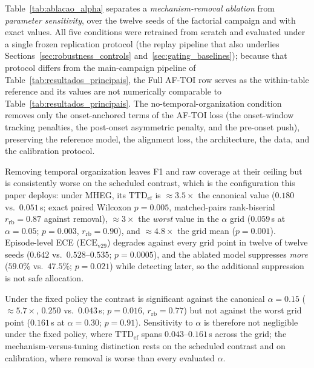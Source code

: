 \documentclass[a4paper,fleqn]{cas-dc}
\newcommand{\MHEG}{\mbox{MHEG}\xspace}
\begin{document}
{\color{\revcolor}Table~\ref{tab:ablacao_alpha} separates a
\emph{mechanism-removal ablation} from \emph{parameter sensitivity}, over the
twelve seeds of the factorial campaign and with exact values. All five
conditions were retrained from scratch and evaluated under a single frozen
replication protocol (the replay pipeline that also underlies
Sections~\ref{sec:robustness_controls} and~\ref{sec:gating_baselines}); because that
protocol differs from the main-campaign pipeline of
Table~\ref{tab:resultados_principais}, the Full \mbox{AF-TOI} row serves as
the within-table reference and its values are not numerically comparable to
Table~\ref{tab:resultados_principais}. The
no-temporal-organization condition removes only the onset-anchored terms of
the \mbox{AF-TOI} loss (the onset-window tracking penalties, the post-onset
asymmetric penalty, and the pre-onset push), preserving the reference model,
the alignment loss, the architecture, the data, and the calibration protocol.

Removing temporal organization leaves F1 and raw coverage at their ceiling
but is consistently worse on the scheduled contrast, which is the
configuration this paper deploys: under \MHEG, its
$\mathrm{TTD}_{\mathrm{ef}}$ is ${\approx}3.5\times$ the canonical value
($0.180$ vs.\ $0.051$\,s; exact paired Wilcoxon $p=0.005$, matched-pairs
rank-biserial $r_{\mathrm{rb}}=0.87$ against removal), ${\approx}3\times$
the \emph{worst} value in the $\alpha$
grid ($0.059$\,s at $\alpha=0.05$; $p=0.003$, $r_{\mathrm{rb}}=0.90$), and
${\approx}4.8\times$ the grid mean ($p=0.001$). Episode-level ECE ($\mathrm{ECE}_{\mathrm{v29}}$) degrades
against every grid point in twelve of twelve seeds ($0.642$ vs.\
$0.528$--$0.535$; $p=0.0005$), and the ablated model suppresses \emph{more}
($59.0\%$ vs.\ $47.5\%$; $p=0.021$) while detecting later, so the additional
suppression is not safe allocation.

Under the fixed policy the contrast is
significant against the canonical $\alpha=0.15$ (${\approx}5.7\times$,
$0.250$ vs.\ $0.043$\,s; $p=0.016$, $r_{\mathrm{rb}}=0.77$) but not against the worst
grid point ($0.161$\,s at $\alpha=0.30$; $p=0.91$). Sensitivity to $\alpha$
is therefore not negligible under the fixed policy, where
$\mathrm{TTD}_{\mathrm{ef}}$ spans $0.043$--$0.161$\,s across the grid; the
mechanism-versus-tuning distinction rests on the scheduled contrast and on
calibration, where removal is worse than every evaluated $\alpha$.}
\end{document}
